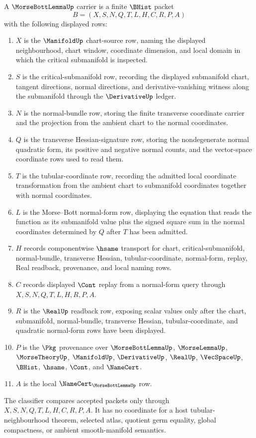 \begin{definition}
\label{def:morse-bott-lemma-carrier}
A $\MorseBottLemmaUp$ carrier is a finite $\BHist$ packet
$$
B=(X,S,N,Q,T,L,H,C,R,P,A)
$$
with the following displayed rows:
\begin{enumerate}
\item $X$ is the $\ManifoldUp$ chart-source row, naming the displayed neighbourhood, chart window, coordinate dimension, and local domain in which the critical submanifold is inspected.
\item $S$ is the critical-submanifold row, recording the displayed submanifold chart, tangent directions, normal directions, and derivative-vanishing witness along the submanifold through the $\DerivativeUp$ ledger.
\item $N$ is the normal-bundle row, storing the finite transverse coordinate carrier and the projection from the ambient chart to the normal coordinates.
\item $Q$ is the transverse Hessian-signature row, storing the nondegenerate normal quadratic form, its positive and negative normal counts, and the vector-space coordinate rows used to read them.
\item $T$ is the tubular-coordinate row, recording the admitted local coordinate transformation from the ambient chart to submanifold coordinates together with normal coordinates.
\item $L$ is the Morse--Bott normal-form row, displaying the equation that reads the function as its submanifold value plus the signed square sum in the normal coordinates determined by $Q$ after $T$ has been admitted.
\item $H$ records componentwise $\hsame$ transport for chart, critical-submanifold, normal-bundle, transverse Hessian, tubular-coordinate, normal-form, replay, Real readback, provenance, and local naming rows.
\item $C$ records displayed $\Cont$ replay from a normal-form query through $X,S,N,Q,T,L,H,R,P,A$.
\item $R$ is the $\RealUp$ readback row, exposing scalar values only after the chart, submanifold, normal-bundle, transverse Hessian, tubular-coordinate, and quadratic normal-form rows have been displayed.
\item $P$ is the $\Pkg$ provenance over $\MorseBottLemmaUp$, $\MorseLemmaUp$, $\MorseTheoryUp$, $\ManifoldUp$, $\DerivativeUp$, $\RealUp$, $\VecSpaceUp$, $\BHist$, $\hsame$, $\Cont$, and $\NameCert$.
\item $A$ is the local $\NameCert_{\MorseBottLemmaUp}$ row.
\end{enumerate}
The classifier compares accepted packets only through $X,S,N,Q,T,L,H,C,R,P,A$. It has no coordinate for a host tubular-neighbourhood theorem, selected atlas, quotient germ equality, global compactness, or ambient smooth-manifold semantics.
\end{definition}

